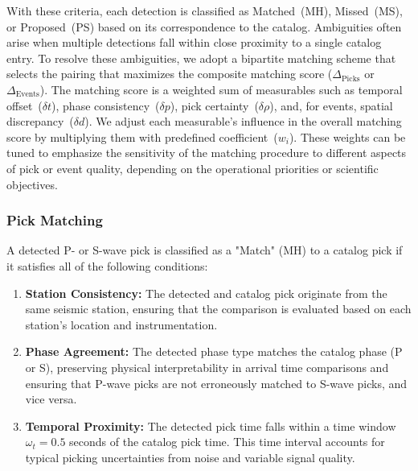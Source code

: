 With these criteria, each detection is classified as Matched~(MH), Missed~(MS),
or Proposed~(PS) based on its correspondence to the catalog. Ambiguities often
arise when multiple detections fall within close proximity to a single catalog
entry. To resolve these ambiguities, we adopt a bipartite matching scheme that
selects the pairing that maximizes the composite matching score
($\Delta_{\text{Picks}}$ or $\Delta_{\text{Events}}$). The matching score is a
weighted sum of measurables such as temporal offset~($\delta t$), phase
consistency~($\delta p$), pick certainty~($\delta \rho$), and, for events,
spatial discrepancy~($\delta d$). We adjust each measurable's influence in the
overall matching score by multiplying  them with predefined
coefficient~($w_i$). These weights can be tuned to emphasize the sensitivity of
the matching procedure to different aspects of pick or event quality, depending
on the operational priorities or scientific objectives.

\subsubsection{Pick Matching}
A detected P- or S-wave pick is classified as a "Match" (MH) to a catalog pick
if it satisfies all of the following conditions:
\begin{enumerate}
  \item \textbf{Station Consistency:} The detected and catalog pick originate
    from the same seismic station, ensuring that the comparison is evaluated
    based on each station's location and instrumentation.
  \item \textbf{Phase Agreement:} The detected phase type matches the catalog
    phase (P or S), preserving physical interpretability in arrival time
    comparisons and ensuring that P-wave picks are not erroneously matched to
    S-wave picks, and vice versa.
  \item \textbf{Temporal Proximity:} The detected pick time falls within a time
    window $\omega_t = 0.5$ seconds of the catalog pick time. This
    time interval
    accounts for typical picking uncertainties from noise and variable signal
    quality.
\end{enumerate}

